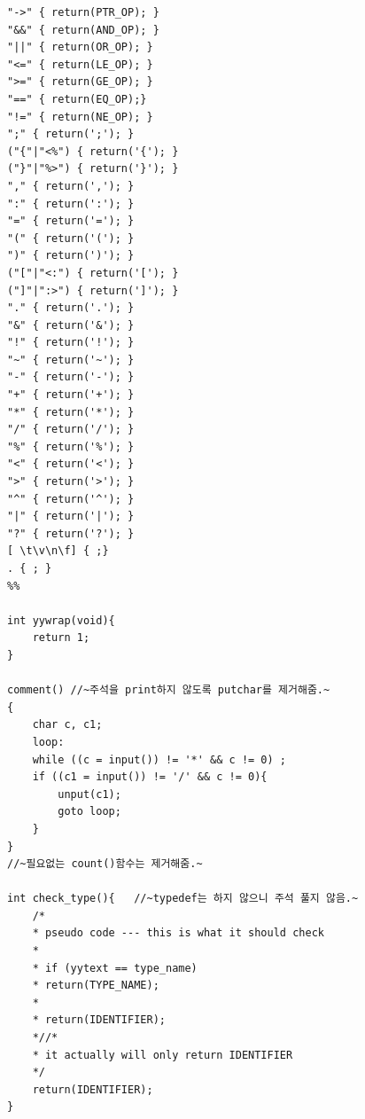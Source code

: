 \documentclass{article}
\begin{document}
\begin{lstlisting}[escapeinside=~~]
"->" { return(PTR_OP); }
"&&" { return(AND_OP); }
"||" { return(OR_OP); }
"<=" { return(LE_OP); }
">=" { return(GE_OP); }
"==" { return(EQ_OP);}
"!=" { return(NE_OP); }
";" { return(';'); }
("{"|"<%") { return('{'); }
("}"|"%>") { return('}'); }
"," { return(','); }
":" { return(':'); }
"=" { return('='); }
"(" { return('('); }
")" { return(')'); }
("["|"<:") { return('['); }
("]"|":>") { return(']'); }
"." { return('.'); }
"&" { return('&'); }
"!" { return('!'); }
"~" { return('~'); }
"-" { return('-'); }
"+" { return('+'); }
"*" { return('*'); }
"/" { return('/'); }
"%" { return('%'); }
"<" { return('<'); }
">" { return('>'); }
"^" { return('^'); }
"|" { return('|'); }
"?" { return('?'); }
[ \t\v\n\f] { ;}
. { ; }
%%

int yywrap(void){
	return 1;
}

comment() //~주석을 print하지 않도록 putchar를 제거해줌.~
{
	char c, c1;
	loop:
	while ((c = input()) != '*' && c != 0) ;
	if ((c1 = input()) != '/' && c != 0){
		unput(c1);
		goto loop;
	}
}
//~필요없는 count()함수는 제거해줌.~

int check_type(){   //~typedef는 하지 않으니 주석 풀지 않음.~
	/*
	* pseudo code --- this is what it should check
	*
	* if (yytext == type_name)
	* return(TYPE_NAME);
	*
	* return(IDENTIFIER);
	*//*
	* it actually will only return IDENTIFIER
	*/
	return(IDENTIFIER);
}
\end{lstlisting}
\end{document}
